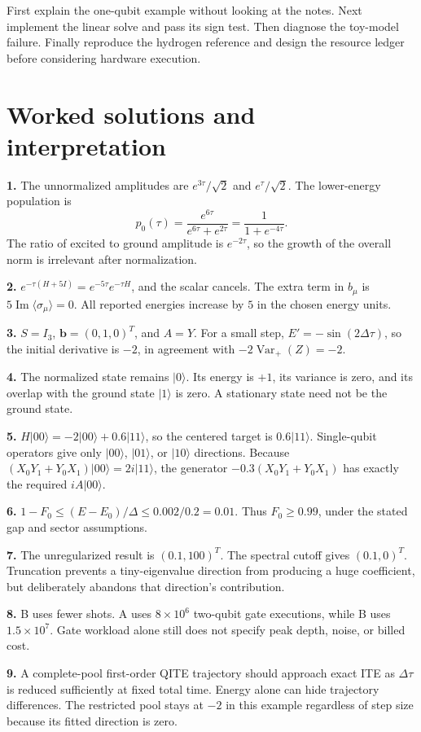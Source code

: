 \documentclass[11pt,a4paper]{article}
\newcommand{\ket}[1]{\lvert #1\rangle}
\newcommand{\ex}[1]{\langle #1\rangle}
\newcommand{\Var}{\operatorname{Var}}
\newcommand{\Ima}{\operatorname{Im}}
\newcommand{\dt}{\Delta\tau}
\newcommand{\lesson}[2]{\clearpage\section{#1}\label{#2}}
\begin{document}
\begin{idea}
First explain the one-qubit example without looking at the notes. Next implement the linear solve and pass its sign test. Then diagnose the toy-model failure. Finally reproduce the hydrogen reference and design the resource ledger before considering hardware execution.
\end{idea}

\lesson{Worked solutions and interpretation}{sec:solutions}
\textbf{1.} The unnormalized amplitudes are $e^{3\tau}/\sqrt2$ and $e^{\tau}/\sqrt2$. The lower-energy population is
\[
p_0(\tau)=\frac{e^{6\tau}}{e^{6\tau}+e^{2\tau}}=\frac{1}{1+e^{-4\tau}}.
\]
The ratio of excited to ground amplitude is $e^{-2\tau}$, so the growth of the overall norm is irrelevant after normalization.

\textbf{2.} $e^{-\tau(H+5I)}=e^{-5\tau}e^{-\tau H}$, and the scalar cancels. The extra term in $b_\mu$ is $5\Ima\ex{\sigma_\mu}=0$. All reported energies increase by $5$ in the chosen energy units.

\textbf{3.} $S=I_3$, $\bm b=(0,1,0)^T$, and $A=Y$. For a small step, $E'=-\sin(2\dt)$, so the initial derivative is $-2$, in agreement with $-2\Var_+(Z)=-2$.

\textbf{4.} The normalized state remains $\ket{0}$. Its energy is $+1$, its variance is zero, and its overlap with the ground state $\ket{1}$ is zero. A stationary state need not be the ground state.

\textbf{5.} $H\ket{00}=-2\ket{00}+0.6\ket{11}$, so the centered target is $0.6\ket{11}$. Single-qubit operators give only $\ket{00}$, $\ket{01}$, or $\ket{10}$ directions. Because $(X_0Y_1+Y_0X_1)\ket{00}=2i\ket{11}$, the generator $-0.3(X_0Y_1+Y_0X_1)$ has exactly the required $iA\ket{00}$.

\textbf{6.} $1-F_0\le(E-E_0)/\Delta\le0.002/0.2=0.01$. Thus $F_0\ge0.99$, under the stated gap and sector assumptions.

\textbf{7.} The unregularized result is $(0.1,100)^T$. The spectral cutoff gives $(0.1,0)^T$. Truncation prevents a tiny-eigenvalue direction from producing a huge coefficient, but deliberately abandons that direction's contribution.

\textbf{8.} B uses fewer shots. A uses $8\times10^6$ two-qubit gate executions, while B uses $1.5\times10^7$. Gate workload alone still does not specify peak depth, noise, or billed cost.

\textbf{9.} A complete-pool first-order QITE trajectory should approach exact ITE as $\dt$ is reduced sufficiently at fixed total time. Energy alone can hide trajectory differences. The restricted pool stays at $-2$ in this example regardless of step size because its fitted direction is zero.
\end{document}
